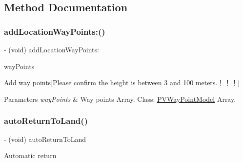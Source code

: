\subsection{Method Documentation}
\mbox{\label{interface_p_v_navigation_a3b5f235a3e682bee46acdf3e5ff8c1cc}} 
\subsubsection{\texorpdfstring{add\+Location\+Way\+Points\+:()}{addLocationWayPoints:()}}
{\footnotesize\ttfamily -\/ (void) add\+Location\+Way\+Points\+: \begin{DoxyParamCaption}\item[{(N\+S\+Array $\ast$)}]{way\+Points }\end{DoxyParamCaption}}

Add way points\mbox{[}Please confirm the height is between 3 and 100 meters.\+！！！\mbox{]}


\begin{DoxyParams}{Parameters}
{\em way\+Points} & Way points Array. Class\+: \hyperlink{interface_p_v_way_point_model}{P\+V\+Way\+Point\+Model} Array. \\
\hline
\end{DoxyParams}
\mbox{\label{interface_p_v_navigation_a4229fe550a53b929e5ec054f99b14415}} 
\subsubsection{\texorpdfstring{auto\+Return\+To\+Land()}{autoReturnToLand()}}
{\footnotesize\ttfamily -\/ (void) auto\+Return\+To\+Land \begin{DoxyParamCaption}{ }\end{DoxyParamCaption}}

Automatic return \mbox{\label{interface_p_v_navigation_ab01dfd18c85bc6060b38dde4803f6728}} 
